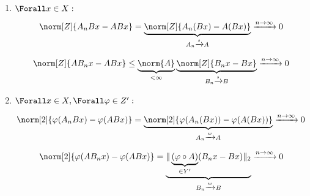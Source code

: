 \begin{solution}
\begin{enumerate}[label = \alph*)]
    \item
    $\Forall x \in X:$

    \begin{align*}
      \norm[Z]{A_n Bx - A B x}
      =
      \underbrace{\norm[Z]{A_n (B x) - A (B x)}}_{A_n \xrightarrow{s} A}
      \xrightarrow{n \to \infty} 0
    \end{align*}

    \begin{align*}
      \norm[Z]{A B_n x - A Bx}
      \leq
      \underbrace{\norm{A}}_{< \infty}
      \underbrace{\norm[Z]{B_n x - B x}}_{B_n \xrightarrow{s} B}
      \xrightarrow{n \to \infty} 0
    \end{align*}

    \item
    $\Forall x \in X, \Forall \varphi \in Z^\prime:$

    \begin{align*}
      \norm[2]{\varphi(A_n B x) - \varphi(A B x)}
      =
      \underbrace{\norm[2]{\varphi(A_n (B x)) - \varphi(A (B x))}}_{A_n \xrightarrow{w} A}
      \xrightarrow{n \to \infty} 0
    \end{align*}

    \begin{align*}
      \norm[2]{\varphi(A B_n x) - \varphi(A B x)}
      =
      \underbrace
      {
        \|
        \underbrace{(\varphi \circ A)}_{\in Y^\prime}
        (B_n x - B x)
        \|_2
      }_{
        B_n \xrightarrow{w} B
      }
      \xrightarrow{n \to \infty} 0
    \end{align*}

\end{enumerate}

\end{solution}
